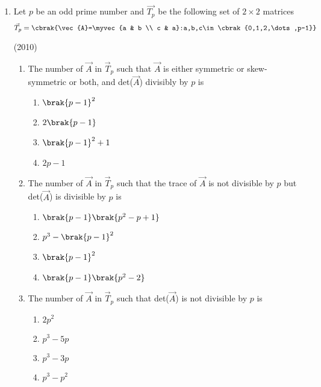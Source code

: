 \begin{enumerate}[label=\thesubsection.\arabic*.,ref=\thesubsection.\theenumi]


	\item Let $p$ be an odd prime number and $\vec{T_p}$ be the following set of $2\times2$ matrices 
	$$\vec{T}_p=\cbrak{\vec{A}=\myvec{a & b \\ c & a}:a,b,c\in\cbrak{0,1,2,\dots,p-1}}$$

			\hfill(2010)
	\begin{enumerate}
		\item The number of $\vec{A}$ in $\vec{T}_p$ such that $\vec{A}$ is either symmetric or skew-symmetric or both, and det($\vec{A}$) divisibly by $p$ is
\begin{multicols}{4}
			\begin{enumerate}
				\item $\brak{p-1}^2$
				\item $2\brak{p-1}$
				\item $\brak{p-1}^2+1$
				\item $2p-1$
			\end{enumerate}
\end{multicols}


		\item The number of $\vec{A}$ in $\vec{T}_p$ such that the trace of $\vec{A}$ is not divisible by $p$ but det($\vec{A}$) is divisible by $p$ is

\begin{multicols}{4}
			\begin{enumerate}
				\item $\brak{p-1}\brak{p^2-p+1}$
				\item $p^3-\brak{p-1}^2$
				\item $\brak{p-1}^2$
				\item $\brak{p-1}\brak{p^2-2}$
			\end{enumerate}
\end{multicols}
%
		\item The number of $\vec{A}$ in $\vec{T}_p$ such that det($\vec{A}$) is not divisible by $p$ is 
\begin{multicols}{4}
			\begin{enumerate}
				\item $2p^2$
				\item $p^3-5p$
				\item $p^3-3p$
				\item $p^3-p^2$
			\end{enumerate}
\end{multicols}


\end{enumerate}
\end{enumerate}
